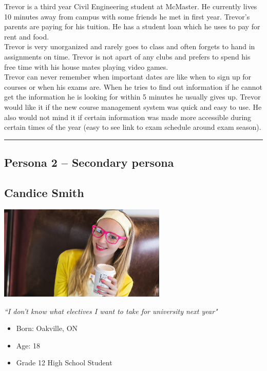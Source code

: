 \documentclass[12pt]{article}
\begin{document}
Trevor is a third year Civil Engineering student at McMaster. He currently lives 10 minutes away from campus with some friends he met in first year. Trevor's parents are paying for his tuition. He has a student loan which he uses to pay for rent and food.\\

Trevor is very unorganized and rarely goes to class and often forgets to hand in assignments on time. Trevor is not apart of any clubs and prefers to spend his free time with his house mates playing video games.\\

Trevor can never remember when important dates are like when to sign up for courses or when his exams are. When he tries to find out information if he cannot get the information he is looking for within 5 minutes he usually gives up. Trevor would like it if the new course management system was quick and easy to use. He also would not mind it if certain information was made more accessible during certain times of the year (easy to see link to exam schedule around exam season).

\newpage
\hrule
\vspace{2mm}
\subsection{Persona 2 -- Secondary persona}
\vspace{11mm}

\subsection*{Candice Smith}
\vspace{4mm}

\begin{minipage}{80mm}
\includegraphics[width=80mm]{Candice.jpg}
\begin{center}
\emph{``I don't know what electives I want to take for university next year"}
\end{center}
\end{minipage} \hfill
\begin{minipage}{\textwidth}
\begin{itemize}
\item Born: Oakville, ON
\item Age: 18
\item Grade 12 High School Student
\end{itemize}
\end{minipage}\\\\\\
\end{document}
